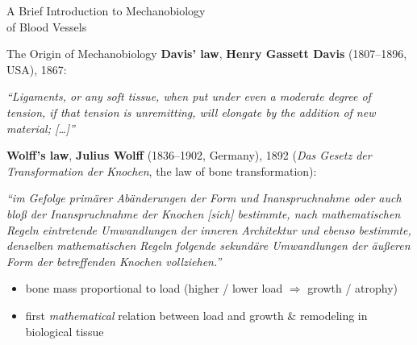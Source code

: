 \begin{frame}[t]{}
  \vfill\begin{center}{\huge\color{YaleBlue} A Brief Introduction to Mechanobiology\\[0.3em] of Blood Vessels}
  \end{center}\vfill
\end{frame}

\begin{frame}[t]{The Origin of Mechanobiology}
  \small
  \textbf{Davis' law}, \textbf{Henry Gassett Davis} (1807--1896, USA), 1867:
  \par\smallskip
  \emph{``Ligaments, or any soft tissue, when put under even a moderate degree of
  tension, if that tension is unremitting, will elongate by the addition of new
  material; [\dots]''}
  \par\medskip
  \textbf{Wolff's law}, \textbf{Julius Wolff} (1836--1902, Germany), 1892
  (\emph{Das Gesetz der Transformation der Knochen}, the law of bone
  transformation):
  \par\smallskip
  {\footnotesize\itshape ``im Gefolge primärer Abänderungen der Form und
  Inanspruchnahme oder auch bloß der Inanspruchnahme der Knochen [sich]
  bestimmte, nach mathematischen Regeln eintretende Umwandlungen der inneren
  Architektur und ebenso bestimmte, denselben mathematischen Regeln folgende
  sekundäre Umwandlungen der äußeren Form der betreffenden Knochen vollziehen.''}
  \par\smallskip
  \begin{itemize}\setlength\itemsep{2pt}
    \item bone mass proportional to load (higher / lower load $\Rightarrow$ growth / atrophy)
    \item first \emph{mathematical} relation between load and growth \& remodeling
      in biological tissue
  \end{itemize}
\end{frame}

